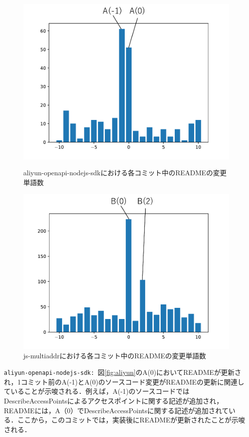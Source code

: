 \documentclass[uplatex,dvipdfmx,a4paper,twocolumn,base=11pt,jbase=11pt,ja=standard]{bxjsarticle}  %
\begin{document}
\begin{figure}[t]
\begin{center}
\includegraphics[width=0.7\linewidth]{use_aliyun.pdf}
\vspace{-5mm}
\caption{aliyun-openapi-nodejs-sdkにおける各コミット中のREADMEの変更単語数}
\label{fig:aliyun}
\end{center}

\vspace{5mm}

\begin{center}
\includegraphics[width=0.7\linewidth]{use_js.pdf}
\caption{js-multiaddrにおける各コミット中のREADMEの変更単語数}
\label{fig:multiaddr}
\end{center}
\end{figure}

\noindent\texttt{aliyun-openapi-nodejs-sdk: }図\ref{fig:aliyun}のA(0)においてREADMEが更新され，1コミット前のA(-1)とA(0)のソースコード変更がREADMEの更新に関連していることが示唆される．例えば，A(-1)のソースコードではDescribeAccessPointsによるアクセスポイントに関する記述が追加され，READMEには，A（0）でDescribeAccessPointsに関する記述が追加されている．ここから，このコミットでは，実装後にREADMEが更新されたことが示唆される．
\end{document}
